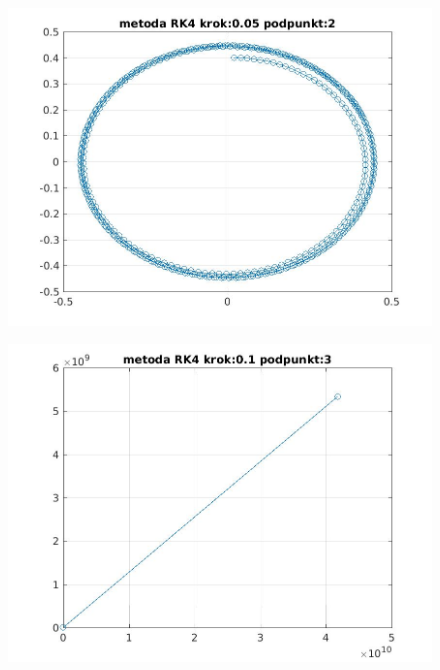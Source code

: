 \documentclass[a4paper, 12pt]{article}
\begin{document}
\begin{figure}[H]
\centering
\includegraphics[width = 15cm]{2d/metoda RK4 krok:0,05 podpunkt:2.jpg}
\end{figure}

\begin{figure}[H]
\centering
\includegraphics[width = 15cm]{2d/metoda RK4 krok:0,1 podpunkt:3.jpg}
\end{figure}
\end{document}
